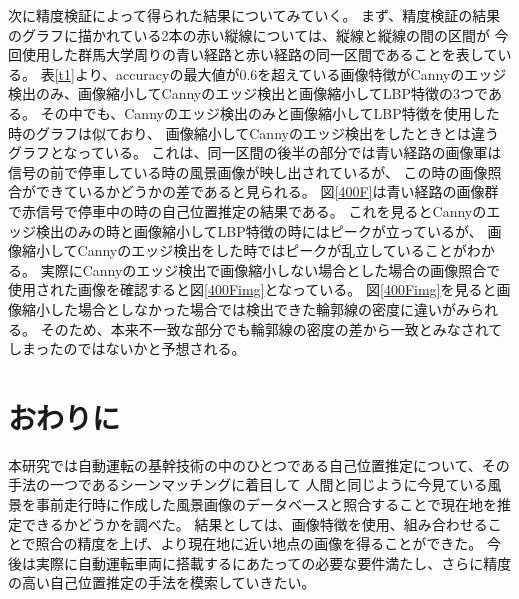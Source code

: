 \documentclass[titlepage,dvipdfmx]{jsarticle}
\begin{document}
次に精度検証によって得られた結果についてみていく。
まず、精度検証の結果のグラフに描かれている2本の赤い縦線については、縦線と縦線の間の区間が
今回使用した群馬大学周りの青い経路と赤い経路の同一区間であることを表している。
表\ref{t1}より、accuracyの最大値が0.6を超えている画像特徴がCannyのエッジ検出のみ、画像縮小してCannyのエッジ検出と画像縮小してLBP特徴の3つである。
その中でも、Cannyのエッジ検出のみと画像縮小してLBP特徴を使用した時のグラフは似ており、
画像縮小してCannyのエッジ検出をしたときとは違うグラフとなっている。
これは、同一区間の後半の部分では青い経路の画像軍は信号の前で停車している時の風景画像が映し出されているが、
この時の画像照合ができているかどうかの差であると見られる。
図\ref{400F}は青い経路の画像群で赤信号で停車中の時の自己位置推定の結果である。
これを見るとCannyのエッジ検出のみの時と画像縮小してLBP特徴の時にはピークが立っているが、
画像縮小してCannyのエッジ検出をした時ではピークが乱立していることがわかる。
実際にCannyのエッジ検出で画像縮小しない場合とした場合の画像照合で使用された画像を確認すると図\ref{400Fimg}となっている。
図\ref{400Fimg}を見ると画像縮小した場合としなかった場合では検出できた輪郭線の密度に違いがみられる。
そのため、本来不一致な部分でも輪郭線の密度の差から一致とみなされてしまったのではないかと予想される。

\section{おわりに}
本研究では自動運転の基幹技術の中のひとつである自己位置推定について、その手法の一つであるシーンマッチングに着目して
人間と同じように今見ている風景を事前走行時に作成した風景画像のデータベースと照合することで現在地を推定できるかどうかを調べた。
結果としては、画像特徴を使用、組み合わせることで照合の精度を上げ、より現在地に近い地点の画像を得ることができた。
今後は実際に自動運転車両に搭載するにあたっての必要な要件満たし、さらに精度の高い自己位置推定の手法を模索していきたい。
\end{document}
